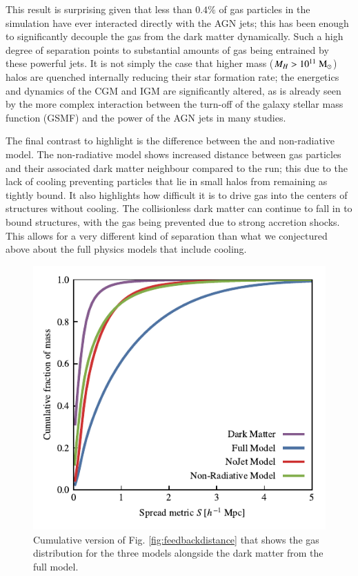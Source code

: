 This result is surprising given that less than $0.4\%$ of gas particles in
the simulation have ever interacted directly with the AGN jets; this has been
enough to 
significantly decouple the gas from the dark matter
dynamically. Such a high degree of separation points to substantial amounts of gas
being entrained by these powerful jets. It is not simply the case that higher
mass ($M_H > 10^{11} \;{\rm M}_{\odot}{}$) halos are quenched internally reducing their
star formation rate; the energetics and dynamics of the CGM and IGM are
significantly altered, as is already seen by the more complex interaction
between the turn-off of the galaxy stellar mass function (GSMF) and the power
of the AGN jets in many studies.

The final contrast to highlight is the difference between the \nojet{} and
non-radiative model. The non-radiative model shows increased distance between
gas particles and their associated dark matter neighbour compared to the
\nojet{} run; this due to the lack of cooling preventing particles that lie
in small halos from remaining as tightly bound. It also highlights how
difficult it is to drive gas into the centers of structures without cooling.
The collisionless dark matter can continue to fall in to bound structures,
with the gas being prevented due to strong accretion shocks. This allows for
a very different kind of separation than what we conjectured above about the
full physics models that include cooling.

\begin{figure}
    \centering
    \includegraphics{figures/cumulative_histogram_comparison.pdf}
    \vspace{-0.7cm}
    \caption{Cumulative version of Fig. \ref{fig:feedbackdistance} that
    shows the gas distribution for the three models alongside the dark
    matter from the full model.}
    \label{fig:cumulativehistogram}
\end{figure}


